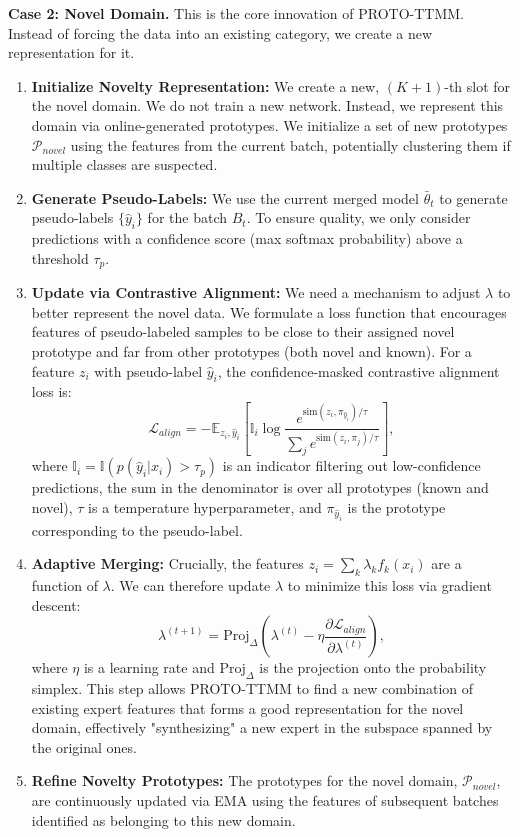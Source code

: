 \documentclass[twoside]{article}
\begin{document}
\textbf{Case 2: Novel Domain.} This is the core innovation of PROTO-TTMM. Instead of forcing the data into an existing category, we create a new representation for it.
\begin{enumerate}
    \item \textbf{Initialize Novelty Representation:} We create a new, $(K+1)$-th slot for the novel domain. We do not train a new network. Instead, we represent this domain via online-generated prototypes. We initialize a set of new prototypes $\mathcal{P}_{novel}$ using the features from the current batch, potentially clustering them if multiple classes are suspected.
    \item \textbf{Generate Pseudo-Labels:} We use the current merged model $\bar{\theta}_t$ to generate pseudo-labels $\{\hat{y}_i\}$ for the batch $B_t$. To ensure quality, we only consider predictions with a confidence score (max softmax probability) above a threshold $\tau_p$.
    \item \textbf{Update via Contrastive Alignment:} We need a mechanism to adjust $\lambda$ to better represent the novel data. We formulate a loss function that encourages features of pseudo-labeled samples to be close to their assigned novel prototype and far from other prototypes (both novel and known). For a feature $z_i$ with pseudo-label $\hat{y}_i$, the confidence-masked contrastive alignment loss is:
    \begin{equation}
    \mathcal{L}_{align} = -\mathbb{E}_{z_i, \hat{y}_i} \left[ \mathbb{I}_i \log \frac{e^{\text{sim}(z_i, \pi_{\hat{y}_i})/\tau}}{\sum_{j} e^{\text{sim}(z_i, \pi_j)/\tau}} \right],
    \end{equation}
    where $\mathbb{I}_i = \mathbb{I}(p(\hat{y}_i|x_i)>\tau_p)$ is an indicator filtering out low-confidence predictions, the sum in the denominator is over all prototypes (known and novel), $\tau$ is a temperature hyperparameter, and $\pi_{\hat{y}_i}$ is the prototype corresponding to the pseudo-label.
    \item \textbf{Adaptive Merging:} Crucially, the features $z_i = \sum_k \lambda_k f_k(x_i)$ are a function of $\lambda$. We can therefore update $\lambda$ to minimize this loss via gradient descent:
    \begin{equation}
    \lambda^{(t+1)} = \text{Proj}_{\Delta} \left( \lambda^{(t)} - \eta \frac{\partial \mathcal{L}_{align}}{\partial \lambda^{(t)}} \right),
    \label{eq:grad_update}
    \end{equation}
    where $\eta$ is a learning rate and $\text{Proj}_{\Delta}$ is the projection onto the probability simplex. This step allows PROTO-TTMM to find a new combination of existing expert features that forms a good representation for the novel domain, effectively "synthesizing" a new expert in the subspace spanned by the original ones.
    \item \textbf{Refine Novelty Prototypes:} The prototypes for the novel domain, $\mathcal{P}_{novel}$, are continuously updated via EMA using the features of subsequent batches identified as belonging to this new domain.
\end{enumerate}
\end{document}
